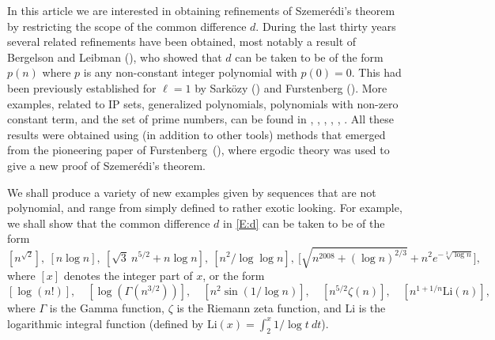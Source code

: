 \documentclass[11pt]{amsart}
\theoremstyle{plain}
\theoremstyle{definition}
\theoremstyle{remark}
\begin{document}
In this article we are interested in obtaining refinements of
Szemer\'edi's theorem by restricting the scope of the common
difference $d$.
 During the last thirty years several related refinements
have been obtained, most notably a result of Bergelson and Leibman
(\cite{BL}), who showed that $d$ can be taken to
be of the form $p(n)$ where $p$ is any
non-constant integer polynomial with $p(0)=0$. This  had been
previously established for $\ell=1$ by Sark\"ozy (\cite{Sa}) and
Furstenberg (\cite{Fu2}).  More examples, related to IP sets,
generalized polynomials, polynomials with non-zero constant term, and
the set of prime numbers, can be found in \cite{FuK2}, \cite{BM},
\cite{M}, \cite{BHM}, \cite {Fr}, \cite{FHK}.  All these results were
obtained using (in addition to other tools) methods that emerged from
the pioneering paper of Furstenberg~(\cite{Fu1}), where ergodic theory
was used to give a new proof of Szemer\'edi's theorem.


We shall produce a variety of new examples given by sequences that are
not polynomial, and range from simply defined to rather exotic looking.
For example, we shall show that the common difference $d$ in
\eqref{E:d} can be taken to be of the form
\begin{equation}\label{E:examples1}
  [n^{\sqrt{2}}], \ [n\log n], \ [\sqrt{3}\ \! n^{5/2}+n\log n],
  \ [n^2/\log\log n],  \ \Big[\sqrt{n^{2008}+(\log n)^{2/3}}+n^2e^{-\sqrt[3]{\log n}}\Big],
\end{equation}
where $[x]$ denotes the integer part of $x$, or the form
\begin{equation}\label{E:examples2}
 [\log(n!)], \quad
  [\log(\Gamma(n^{3/2}))],\quad [n^2\sin(1/\log{n})], \quad [n^{5/2}
  \zeta(n)],\quad [n^{1+1/n}\text{Li}(n)],
\end{equation}
where $\Gamma$ is the Gamma function, $\zeta$ is the Riemann zeta
function, and $\text{Li}$ is the logarithmic integral function
(defined by $\text{Li}(x)=\int_2^x 1/\log t\ dt$).
\end{document}
